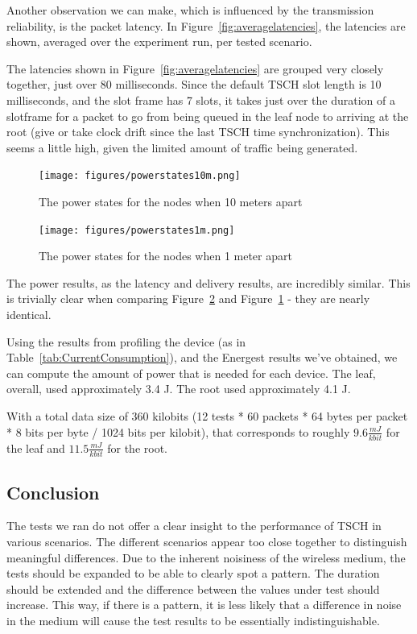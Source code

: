 \documentclass[conference]{IEEEtran}
\newcommand{\figref}[1]{Figure~\ref{#1}}
\newcommand{\tabref}[1]{Table~\ref{#1}}
\renewcommand\_{\textunderscore\allowbreak}
\begin{document}
Another observation we can make, which is influenced by the transmission reliability, is the packet latency. In \figref{fig:averagelatencies}, the latencies are shown, averaged over the experiment run, per tested scenario. 

The latencies shown in \figref{fig:averagelatencies} are grouped very closely together, just over 80 milliseconds. Since the default TSCH slot length is 10 milliseconds, and the slot frame has 7 slots, it takes just over the duration of a slotframe for a packet to go from being queued in the leaf node to arriving at the root (give or take clock drift since the last TSCH time synchronization). This seems a little high, given the limited amount of traffic being generated. 


\begin{figure}[htbp]
	\centering
	\texttt{[image: figures/powerstates\_10m.png]}
	\caption{The power states for the nodes when 10 meters apart}
	\label{fig:power10m}
\end{figure}
\begin{figure}[htbp]
	\centering
	\texttt{[image: figures/powerstates\_1m.png]}
	\caption{The power states for the nodes when 1 meter apart}
	\label{fig:power1m}
\end{figure}

The power results, as the latency and delivery results, are incredibly similar. This is trivially clear when comparing \figref{fig:power1m} and \figref{fig:power10m} - they are nearly identical. 

Using the results from profiling the device (as in \tabref{tab:CurrentConsumption}), and the Energest results we've obtained, we can compute the amount of power that is needed for each device. The leaf, overall, used approximately 3.4 J. The root used approximately 4.1 J.

With a total data size of 360 kilobits (12 tests * 60 packets * 64 bytes per packet * 8 bits per byte / 1024 bits per kilobit), that corresponds to roughly $9.6 \frac{mJ}{kbit}$ for the leaf and $11.5 \frac{mJ}{kbit}$ for the root.


\subsection{Conclusion}

The tests we ran do not offer a clear insight to the performance of TSCH in various scenarios. The different scenarios appear too close together to distinguish meaningful differences. Due to the inherent noisiness of the wireless medium, the tests should be expanded to be able to clearly spot a pattern. The duration should be extended and the difference between the values under test should increase. This way, if there is a pattern, it is less likely that a difference in noise in the medium will cause the test results to be essentially indistinguishable. 
\end{document}
